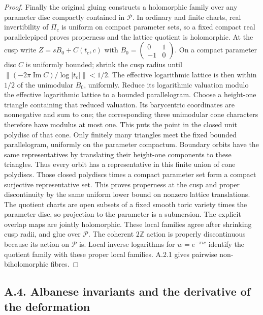 \begin{proof}
Finally the original gluing constructs a holomorphic family over any parameter disc compactly contained in $\mathcal P$. In ordinary and finite charts, real invertibility of $\Pi_c$ is uniform on compact parameter sets, so a fixed compact real parallelepiped proves properness and the lattice quotient is holomorphic. At the cusp write $Z=sB_0+C(t_c,c)$ with $B_0=\left(\begin{smallmatrix}0&1\\-1&0\end{smallmatrix}\right)$. On a compact parameter disc $C$ is uniformly bounded; shrink the cusp radius until
$\|(-2\pi\operatorname{Im}C)/\log|t_c|\|<1/2$. The effective logarithmic lattice is then within $1/2$ of the unimodular $B_0$, uniformly. Reduce its logarithmic valuation modulo the effective logarithmic lattice to a bounded parallelogram. Choose a height-one triangle containing that reduced valuation. Its barycentric coordinates are nonnegative and sum to one; the corresponding three unimodular cone characters therefore have modulus at most one. This puts the point in the closed unit polydisc of that cone. Only finitely many triangles meet the fixed bounded parallelogram, uniformly on the parameter compactum. Boundary orbits have the same representatives by translating their height-one components to these triangles. Thus every orbit has a representative in this finite union of cone polydiscs. Those closed polydiscs times a compact parameter set form a compact surjective representative set. This proves properness at the cusp and proper discontinuity by the same uniform lower bound on nonzero lattice translations. The quotient charts are open subsets of a fixed smooth toric variety times the parameter disc, so projection to the parameter is a submersion. The explicit overlap maps are jointly holomorphic. These local families agree after shrinking cusp radii, and glue over $\mathcal P$. The coherent $2\mathbb Z$ action is properly discontinuous because its action on $\mathcal P$ is. Local inverse logarithms for $w=e^{-\pi ic}$ identify the quotient family with these proper local families. A.2.1 gives pairwise non-biholomorphic fibres.
\end{proof}

\subsection{A.4. Albanese invariants and the derivative of the deformation}

